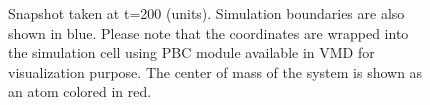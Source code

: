 \documentclass{article}
\begin{document}
\begin{figure}[H]
\begin{centering}
\caption{Snapshot taken at t=200 (units). Simulation boundaries are also shown in blue. Please note that the coordinates are wrapped into the simulation cell using PBC module available in VMD for visualization purpose. The center of mass of the system is shown as an atom colored in red.}
\label{fig:fig2e}
\end{centering}
\end{figure}
\end{document}

